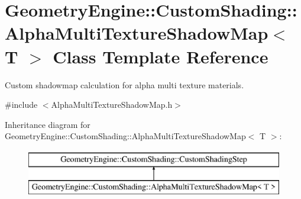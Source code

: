 \hypertarget{class_geometry_engine_1_1_custom_shading_1_1_alpha_multi_texture_shadow_map}{}\section{Geometry\+Engine\+::Custom\+Shading\+::Alpha\+Multi\+Texture\+Shadow\+Map$<$ T $>$ Class Template Reference}
\label{class_geometry_engine_1_1_custom_shading_1_1_alpha_multi_texture_shadow_map}


Custom shadowmap calculation for alpha multi texture materials.  




{\ttfamily \#include $<$Alpha\+Multi\+Texture\+Shadow\+Map.\+h$>$}

Inheritance diagram for Geometry\+Engine\+::Custom\+Shading\+::Alpha\+Multi\+Texture\+Shadow\+Map$<$ T $>$\+:\begin{figure}[H]
\begin{center}
\leavevmode
\includegraphics[height=2.000000cm]{class_geometry_engine_1_1_custom_shading_1_1_alpha_multi_texture_shadow_map}
\end{center}
\end{figure}
